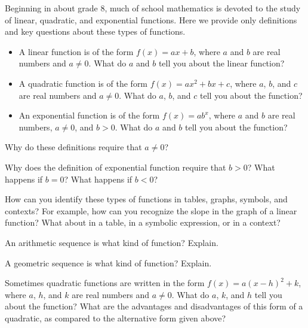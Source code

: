 Beginning in about grade 8, much of school mathematics is devoted to the study of linear, quadratic, and exponential functions.  Here we provide only definitions and key questions about these types of functions.  

\begin{itemize}
\item A linear function is of the form $f(x) = ax + b$, where $a$ and $b$ are real numbers and $a\ne 0$.  What do $a$ and $b$ tell you about the linear function?  
\item A quadratic function is of the form $f(x) = ax^2 + bx + c$, where $a$,  $b$, and $c$ are real numbers and $a\ne 0$.  What do $a$, $b$, and $c$ tell you about the function?   
\item An exponential function is of the form $f(x)=ab^x$, where $a$ and $b$ are real numbers, $a\ne 0$, and $b>0$.  What do $a$ and $b$ tell you about the function? 
\end{itemize}

\begin{question}
Why do these definitions require that $a \ne 0$?  
\end{question}
\QM

\begin{question}
Why does the definition of exponential function require that $b > 0$?  What happens if $b=0$?  What happens if $b<0$?
\end{question}
\QM

How can you identify these types of functions in tables, graphs, symbols, and contexts?   
For example, how can you recognize the slope in the graph of a linear function?  What about in a table, in a symbolic expression, or in a context?  

\begin{question}
An arithmetic sequence is what kind of function?  Explain. 
\end{question}
\QM

\begin{question}
A geometric sequence is what kind of function?  Explain.  
\end{question}
\QM

\begin{question}
Sometimes quadratic functions are written in the form $f(x) = a(x-h)^2+k$, where $a$, $h$, and $k$ are real numbers and $a\ne 0$.  What do $a$, $k$, and $h$ tell you about the function?  What are the advantages and disadvantages of this form of a quadratic, as compared to the alternative form given above?  
\end{question}
\QM

